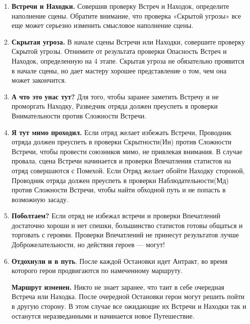 \begin{enumerate}
\item \textbf{Встречи и Находки.} Совершив проверку Встреч и Находок, определите наполнение сцены. Обратите внимание, что проверка «Скрытой угрозы» все еще может серьезно изменить смысловое наполнение сцены.
\item \textbf{Скрытая угроза.} В начале сцены Встречи или Находки, совершите проверку Скрытой угрозы. Отнимите от результата проверки Опасность Встреч и Находок, определенную на 4 этапе. Скрытая угроза не обязательно проявится в начале сцены, но дает мастеру хорошее представление о том, чем она может закончится.
\item \textbf{А что это унас тут?} Для того, чтобы заранее заметить Встречу и не проморгать Находку, Разведчик отряда должен преуспеть в проверки Внимательности против Сложности Встречи.
\item \textbf{Я тут мимо проходил.} Если отряд желает избежать Встречи, Проводник отряда должен преуспеть в проверки Скрытности(Ин) против Сложности Встречи, чтобы провести союзников мимо, не привлекая внимания. В случае провала, сцена Встречи начинается и проверки Впечатления статистов на отряд совершаются с Помехой.
\newline
Если Отряд желает обойти Находку стороной, Проводник отряда должен преуспеть в проверки Наблюдательности(Мд) против Сложности Встречи, чтобы найти обходной путь и не попасть в возможную засаду.
\item \textbf{Поболтаем?} Если отряд не избежал встречи и проверки Впечатлений достаточно хороши и нет спешки, большинство статистов готовы общаться и торговать с героями. Проверки Впечатлений не принесут результатов лучше Доброжелательности, но действия героев — могут!
\item \textbf{Отдохнули и в путь}. После каждой Остановки идет Антракт, во время которого герои продвигаются по намеченному маршруту.
\begin{tcolorbox}
\textbf{Маршрут изменен.} Никто не знает заранее, что таит в себе очередная Встреча или Находка. После очередной Остановки герои могут решить пойти в другую сторону. В этом случае все ожидающие их Встречи и Находки так и останутся неразведанными и начинается новое Путешествие.
\end{tcolorbox}
\end{enumerate}
